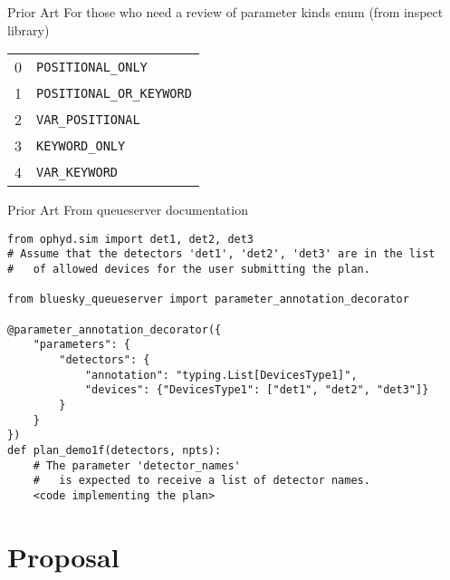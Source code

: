 \documentclass{presentation}
\begin{document}
\begin{frame}{Prior Art}
  For those who need a review of parameter kinds enum (from inspect library)
  \begin{tabular}{ l | l }
    0 & \texttt{POSITIONAL\_ONLY} \\
    1 & \texttt{POSITIONAL\_OR\_KEYWORD} \\
    2 & \texttt{VAR\_POSITIONAL} \\
    3 & \texttt{KEYWORD\_ONLY} \\
    4 & \texttt{VAR\_KEYWORD} \\
  \end{tabular}
\end{frame}

\begin{frame}[fragile]{Prior Art}
  From queueserver documentation
  \vfill

  \scriptsize
  \begin{verbatim}
from ophyd.sim import det1, det2, det3
# Assume that the detectors 'det1', 'det2', 'det3' are in the list
#   of allowed devices for the user submitting the plan.

from bluesky_queueserver import parameter_annotation_decorator

@parameter_annotation_decorator({
    "parameters": {
        "detectors": {
            "annotation": "typing.List[DevicesType1]",
            "devices": {"DevicesType1": ["det1", "det2", "det3"]}
        }
    }
})
def plan_demo1f(detectors, npts):
    # The parameter 'detector_names'
    #   is expected to receive a list of detector names.
    <code implementing the plan>
  \end{verbatim}
\end{frame}

\section{Proposal}
\end{document}
